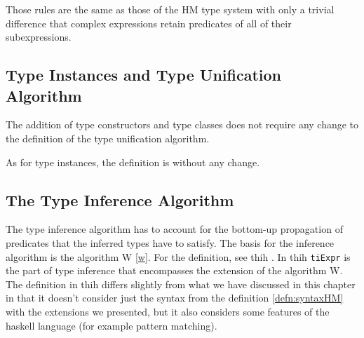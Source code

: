 Those rules are the same as those of the HM type system with only a trivial difference that complex expressions retain predicates of all of their subexpressions.


\subsection{Type Instances and Type Unification Algorithm}


The addition of type constructors and type classes does not require any change to the definition of the type unification algorithm.

As for type instances, the definition is without any change.

\subsection{The Type Inference Algorithm}

The type inference algorithm has to account for the bottom-up propagation of predicates that the inferred types have to satisfy. The basis for the inference algorithm is the algorithm W \ref{w}. For the definition, see thih \cite{jones1999typing}. In thih \lstinline[language=haskell]{tiExpr} is the part of type inference that encompasses the extension of the algorithm W. The definition in thih differs slightly from what we have discussed in this chapter in that it doesn't consider just the syntax from the definition \ref{defn:syntaxHM} with the extensions we presented, but it also considers some features of the haskell language (for example pattern matching).


